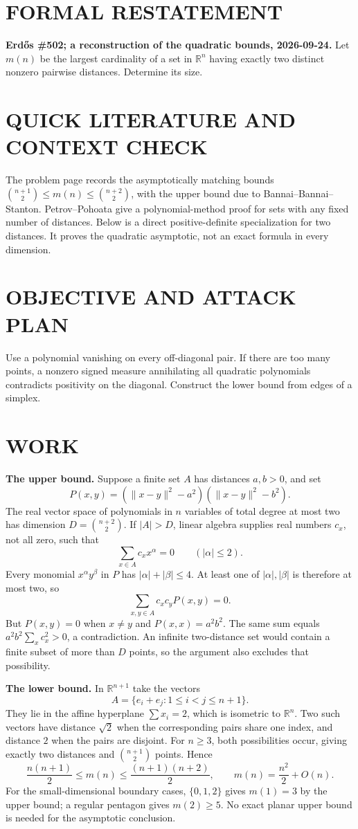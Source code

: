 \section{FORMAL RESTATEMENT}
\textbf{Erd\H{o}s \#502; a reconstruction of the quadratic bounds, 2026-09-24.}
Let $m(n)$ be the largest cardinality of a set in $\mathbb R^n$ having exactly two distinct nonzero pairwise distances. Determine its size.

\section{QUICK LITERATURE AND CONTEXT CHECK}
The problem page records the asymptotically matching bounds
$\binom{n+1}{2}\leq m(n)\leq\binom{n+2}{2}$, with the upper bound due to Bannai--Bannai--Stanton. Petrov--Pohoata give a polynomial-method proof for sets with any fixed number of distances. Below is a direct positive-definite specialization for two distances. It proves the quadratic asymptotic, not an exact formula in every dimension.

\section{OBJECTIVE AND ATTACK PLAN}
Use a polynomial vanishing on every off-diagonal pair. If there are too many points, a nonzero signed measure annihilating all quadratic polynomials contradicts positivity on the diagonal. Construct the lower bound from edges of a simplex.

\section{WORK}
\textbf{The upper bound.} Suppose a finite set $A$ has distances $a,b>0$, and set
\[
 P(x,y)=(\|x-y\|^2-a^2)(\|x-y\|^2-b^2).
\]
The real vector space of polynomials in $n$ variables of total degree at most two has dimension $D=\binom{n+2}{2}$. If $|A|>D$, linear algebra supplies real numbers $c_x$, not all zero, such that
\[
 \sum_{x\in A}c_x x^\alpha=0\qquad (|\alpha|\leq2).
\]
Every monomial $x^\alpha y^\beta$ in $P$ has $|\alpha|+|\beta|\leq4$. At least one of $|\alpha|,|\beta|$ is therefore at most two, so
\[
 \sum_{x,y\in A}c_xc_yP(x,y)=0.
\]
But $P(x,y)=0$ when $x\ne y$ and $P(x,x)=a^2b^2$. The same sum equals $a^2b^2\sum_xc_x^2>0$, a contradiction. An infinite two-distance set would contain a finite subset of more than $D$ points, so the argument also excludes that possibility.

\textbf{The lower bound.} In $\mathbb R^{n+1}$ take the vectors
\[
 A=\{e_i+e_j:1\leq i<j\leq n+1\}.
\]
They lie in the affine hyperplane $\sum x_i=2$, which is isometric to $\mathbb R^n$. Two such vectors have distance $\sqrt2$ when the corresponding pairs share one index, and distance $2$ when the pairs are disjoint. For $n\geq3$, both possibilities occur, giving exactly two distances and $\binom{n+1}{2}$ points. Hence
\[
 \frac{n(n+1)}2\leq m(n)\leq\frac{(n+1)(n+2)}2,
 \qquad m(n)=\frac{n^2}{2}+O(n).
\]
For the small-dimensional boundary cases, $\{0,1,2\}$ gives $m(1)=3$ by the upper bound; a regular pentagon gives $m(2)\geq5$. No exact planar upper bound is needed for the asymptotic conclusion.

